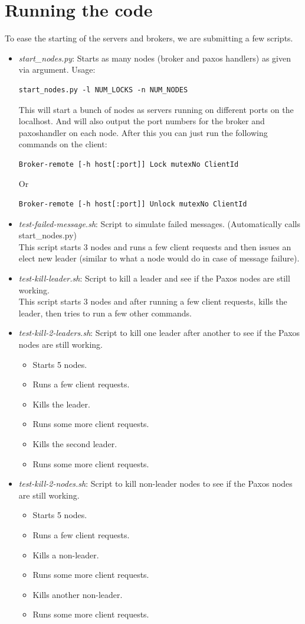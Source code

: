 \documentclass[letterpaper]{article}
\begin{document}
\section{Running the code}
To ease the starting of the servers and brokers, we are submitting a few scripts.
\begin{itemize}
\item {\em start\_nodes.py}: Starts as many nodes (broker and paxos handlers) as given via argument. Usage:
\begin{verbatim}
start_nodes.py -l NUM_LOCKS -n NUM_NODES
\end{verbatim}
This will start a bunch of nodes as servers running on different ports on the localhost. And will also output the port numbers for the broker and paxoshandler on each node. After this you can just run the following commands on the client:
\begin{verbatim}
Broker-remote [-h host[:port]] Lock mutexNo ClientId
\end{verbatim}
Or
\begin{verbatim}
Broker-remote [-h host[:port]] Unlock mutexNo ClientId
\end{verbatim}

\item {\em test-failed-message.sh}: Script to simulate failed messages. (Automatically calls start\_nodes.py)\\
This script starts 3 nodes and runs a few client requests and then issues an elect new leader (similar to what a node would do in case of message failure). 
\item {\em test-kill-leader.sh}: Script to kill a leader and see if the Paxos nodes are still working.\\
This script starts 3 nodes and after running a few client requests, kills the leader, then tries to run a few other commands. 
\item {\em test-kill-2-leaders.sh}: Script to kill one leader after another to see if the Paxos nodes are still working.
\begin{itemize}
\item Starts 5 nodes.
\item Runs a few client requests.
\item Kills the leader.
\item Runs some more client requests.
\item Kills the second leader.
\item Runs some more client requests.
\end{itemize}
\item {\em test-kill-2-nodes.sh}: Script to kill non-leader nodes to see if the Paxos nodes are still working.
\begin{itemize}
\item Starts 5 nodes.
\item Runs a few client requests.
\item Kills a non-leader.
\item Runs some more client requests.
\item Kills another non-leader.
\item Runs some more client requests.
\end{itemize}


\end{itemize}
\end{document}
